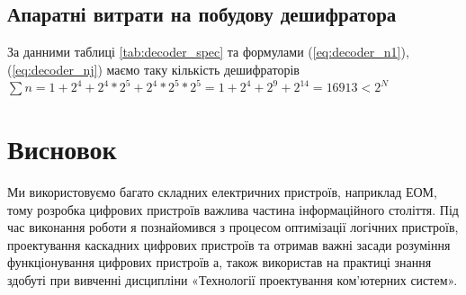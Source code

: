 \section{Апаратні витрати на побудову дешифратора}
За данними таблиці \ref{tab:decoder_spec} та формулами (\ref{eq:decoder_n1}),(\ref{eq:decoder_nj}) маємо таку кількість дешифраторів $\sum n=1+2^{4}+2^{4}*2^{5}+2^{4}*2^{5}*2^{5}=1+2^{4}+2^{9}+2^{14}=16913<2^{N}$
\newpage
\chapter{Висновок}
Ми використовуємо багато складних електричних пристроїв, наприклад ЕОМ, тому розробка цифрових пристроїв важлива частина інформаційного століття. Під час виконання роботи я познайомився з процесом оптимізації логічних пристроїв, проектування каскадних цифрових пристроїв та отримав важні засади розуміння функціонування цифрових пристроїв а, також використав на практиці знання здобуті при вивченні дисципліни «Технології проектування ком'ютерних систем».
